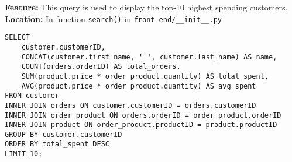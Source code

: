 \textbf{Feature:} This query is used to display the top-10 highest spending customers. \\
\textbf{Location:} In function \texttt{search()} in \texttt{front-end/\_\_init\_\_.py}

\begin{lstlisting}
SELECT
    customer.customerID,
    CONCAT(customer.first_name, ' ', customer.last_name) AS name,
    COUNT(orders.orderID) AS total_orders,
    SUM(product.price * order_product.quantity) AS total_spent,
    AVG(product.price * order_product.quantity) AS avg_spent
FROM customer
INNER JOIN orders ON customer.customerID = orders.customerID
INNER JOIN order_product ON orders.orderID = order_product.orderID
INNER JOIN product ON order_product.productID = product.productID
GROUP BY customer.customerID
ORDER BY total_spent DESC
LIMIT 10;
\end{lstlisting}